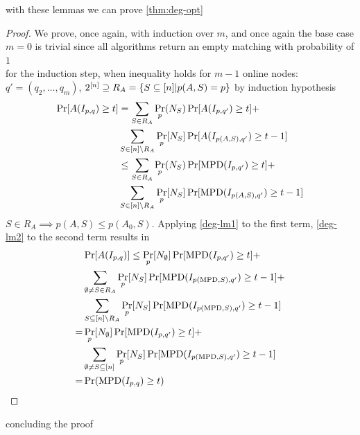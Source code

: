 with these lemmas we can prove \autoref{thm:deg-opt}
\begin{proof}
	We prove, once again, with induction over $m$, and once again the base case $m=0$ is trivial since all algorithms return an empty matching with probability of $1$\\
	for the induction step, when inequality holds for $m-1$ online nodes:\\
	$q'=(q_2,\dots,q_m)$, $2^{[n]}\supseteq R_A=\{S\subseteq[n]|p(A,S)=p\}$
	by induction hypothesis
	\begin{align*}
		\Pr[A(I_{p,q})\geq t]&=\sum\limits_{S\in R_A}\Pr_p(N_S)\Pr[A(I_{p,q'})\geq t]+\\
		&\sum\limits_{S\in[n]\backslash R_A}\Pr_p[N_S]\Pr[A(I_{p(A,S),q'})\geq t-1]\\
		&\leq\sum\limits_{S\in R_A}\Pr_p(N_S)\Pr[\mathrm{MPD}(I_{p,q'})\geq t]+\\
		&\sum\limits_{S\in[n]\backslash R_A}\Pr_p[N_S]\Pr[\mathrm{MPD}(I_{p(A,S),q'})\geq t-1]
	\end{align*}
	$S\in R_A\implies p(A,S)\leq p(A_0,S)$. Applying \autoref{deg-lm1} to the first term, \autoref{deg-lm2} to the second term results in
	\begin{align*}
		&\Pr[A(I_{p,q})]\leq\Pr_p[N_\emptyset]\Pr[\mathrm{MPD}(I_{p,q'})\geq t]+\\
		&\sum\limits_{\emptyset\neq S\in R_A}\Pr_p[N_S]\Pr[\mathrm{MPD}(I_{p(\mathrm{MPD},S),q'})\geq t-1]+\\
		&\sum\limits_{S\subseteq[n]\backslash R_A}\Pr_p[N_S]\Pr[\mathrm{MPD}(I_{p(\mathrm{MPD},S),q'})\geq t-1]\\
		=&\Pr_p[N_\emptyset]\Pr[\mathrm{MPD}(I_{p,q'})\geq t]+\\
		&\sum\limits_{\emptyset\neq S\subseteq[n]}\Pr_p[N_S]\Pr[\mathrm{MPD}(I_{p(\mathrm{MPD},S),q'})\geq t-1]\\
		=&\Pr(\mathrm{MPD}(I_{p,q})\geq t)
	\end{align*}
\end{proof}
concluding the proof